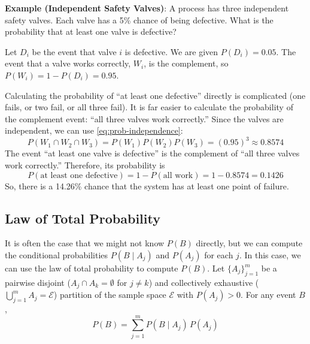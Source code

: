 \begin{exampleBox}
    \textbf{Example (Independent Safety Valves)}: A process has three independent safety valves. Each valve has a 5\% chance of being defective. What is the probability that at least one valve is defective?

    Let $D_i$ be the event that valve $i$ is defective. We are given $P(D_i) = 0.05$. The event that a valve works correctly, $W_i$, is the complement, so $P(W_i) = 1 - P(D_i) = 0.95$.

    Calculating the probability of ``at least one defective'' directly is complicated (one fails, or two fail, or all three fail). It is far easier to calculate the probability of the complement event: ``all three valves work correctly.'' Since the valves are independent, we can use \autoref{eq:prob-independence}:
    \begin{equation}
        P(W_1 \cap W_2 \cap W_3) = P(W_1)P(W_2)P(W_3) = (0.95)^3 \approx 0.8574
    \end{equation}
    The event ``at least one valve is defective'' is the complement of ``all three valves work correctly.'' Therefore, its probability is
    \begin{equation}
        P(\text{at least one defective}) = 1 - P(\text{all work}) = 1 - 0.8574 = 0.1426
    \end{equation}
    So, there is a 14.26\% chance that the system has at least one point of failure.
\end{exampleBox}

\subsection{Law of Total Probability}
It is often the case that we might not know $P(B)$ directly, but we can compute the conditional probabilities $P(B \mid A_j)$ and $P(A_j)$ for each $j$. In this case, we can use the law of total probability to compute $P(B)$. Let $\{A_j\}_{j=1}^m$ be a pairwise disjoint ($A_j \cap A_k = \emptyset$ for $j\neq k$) and collectively exhaustive ($\bigcup_{j=1}^m A_j = \mathcal{E}$) partition of the sample space $\mathcal{E}$ with $P(A_j)>0$. For any event $B$,
\begin{equation}
    P(B) = \sum_{j=1}^m P\!\left(B \mid A_j\right)\,P(A_j)
    \label{eq:ltp-events}
\end{equation}

